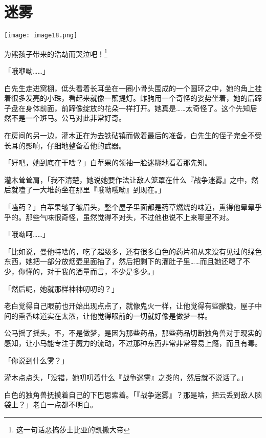 \chapter{迷雾}

\texttt{[image: image18.png]}

\begin{intro}
    为熊孩子带来的浩劫而哭泣吧！\footnote{这一句话恶搞莎士比亚的凯撒大帝}
\end{intro}


「哦咿呦……」

白先生走进窝棚，低头看着长耳坐在一圈小骨头围成的一个圆环之中，她的角上挂着很多发亮的小珠，看起来就像一蘸提灯。雌驹用一个奇怪的姿势坐着，她的后蹄子盘在身体前面，前蹄像绽放的花朵一样打开。她真是……太奇怪了。这个先知居然不是一个斑马。公马对此非常好奇。

在房间的另一边，灌木正在为去铁砧镇而做着最后的准备，白先生的侄子完全不受长耳的影响，仔细地整备着他的武器。

「好吧，她到底在干啥？」白苹果的领袖一脸迷糊地看着那先知。

灌木耸耸肩，「我不清楚，她说她要作法让敌人笼罩在什么『战争迷雾』之中，然后就嗑了一大堆药坐在那里『哦呦哦呦』到现在。」

「嗑药？」白苹果皱了皱眉头，整个屋子里面都是药草燃烧的味道，熏得他晕晕乎乎的。那些气味很奇怪，虽然觉得不对头，不过他也说不上来哪里不对。

「哦呦呵……」

「比如说，曼他特啥的，吃了超级多，还有很多白色的药片和从来没有见过的绿色东西，她把一部分放烟壶里面抽了，然后把剩下的灌肚子里……而且她还喝了不少，你懂的，对于我的酒量而言，不少是多少。」

「然后呢，她就那样神神叨叨的？」

老白觉得自己眼前也开始出现点点了，就像鬼火一样，让他觉得有些朦胧，屋子中间的熏香味道实在太浓，让他觉得眼前的一切就好像是做梦一样。

公马摇了摇头，不，不是做梦，是因为那些药品，那些药品切断独角兽对于现实的感知，让小马能专注于魔力的流动，不过那种东西非常非常容易上瘾，而且有毒。

「你说到什么雾？」

灌木点点头，「没错，她叨叨着什么『战争迷雾』之类的，然后就不说话了。」

白色的独角兽抚摸着自己的下巴思索着。「『战争迷雾』？那是啥，把云丢到敌人脑袋上？」老白一点都不明白。

